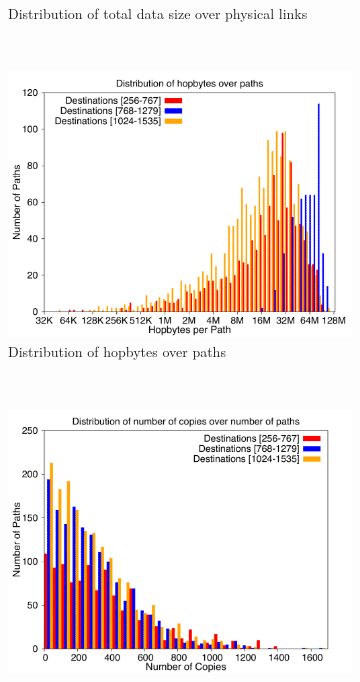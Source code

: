 \documentclass[letter]{article}
\begin{document}
\begin{figure}[!htbp]
\begin{subfigure}[b]{0.49\textwidth}
                \caption{Distribution of total data size over physical links}
                \label{fig:incrdist_2k_loaddata}
        \end{subfigure}
        ~ %
        \begin{subfigure}[b]{0.49\textwidth}
                \includegraphics[width=\textwidth]{report_figures/incrdist/2k/hopbyte_histo.pdf}
                \caption{Distribution of hopbytes over paths}
                \label{fig:incrdist_2k_hopbyte}
        \end{subfigure}
        ~ %
        \begin{subfigure}[b]{0.49\textwidth}
                \includegraphics[width=\textwidth]{report_figures/incrdist/2k/hopcopy_histo.pdf}

\end{subfigure}
\end{figure}
\end{document}
